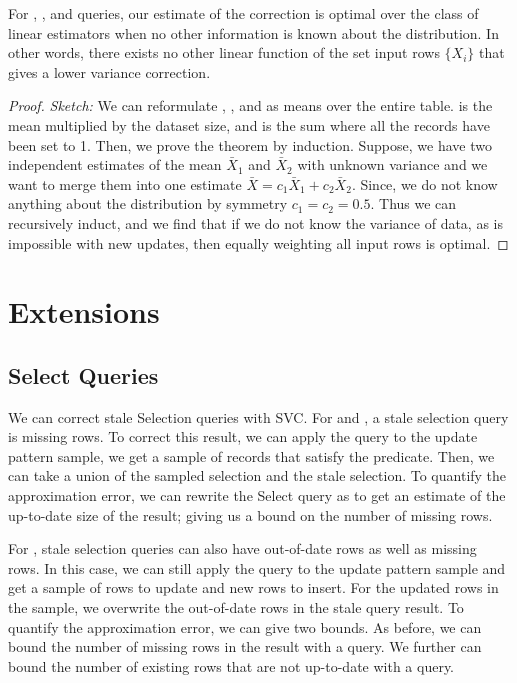 \begin{theorem}
For \sumfunc, \countfunc, and \avgfunc queries, our estimate of the correction is optimal over the class of linear estimators when no other information is known about the distribution. 
In other words, there exists no other linear function of the set input rows $\{ X_i \}$ that gives a lower variance correction.
\end{theorem}
\begin{proof}
\emph{Sketch: } We can reformulate \sumfunc, \countfunc, and \avgfunc as means over the entire table. \sumfunc is the mean multiplied by the dataset size, and \countfunc
is the sum where all the records have been set to 1. Then, we prove the theorem by induction. 
Suppose, we have two independent estimates of the mean $\bar{X}_1$ and $\bar{X}_2$ with unknown variance and we want to merge them into one estimate $\bar{X} = c_1\bar{X}_1+c_2\bar{X}_2$.
Since, we do not know anything about the distribution by symmetry $c_1 = c_2 = 0.5$. 
Thus we can recursively induct, and we find that if we do not know the variance of data, as is impossible with new updates, then equally weighting all input rows is optimal. 
\end{proof}

\section{Extensions}
\subsection{Select Queries}\label{sec:sel}
We can correct stale Selection queries with SVC.
For \fjview and \spview, a stale selection query is missing rows.
To correct this result, we can apply the query to the update pattern sample, we get a sample of records that satisfy the predicate.
Then, we can take a union of the sampled selection and the stale selection.
To quantify the approximation error, we can rewrite the Select query as \countfunc to get an estimate of the up-to-date size of the result; giving us a bound on the number of missing rows.

For \aggview, stale selection queries can also have out-of-date rows as well as missing rows.
In this case, we can still apply the query to the update pattern sample and get a sample of rows to update and new rows to insert.
For the updated rows in the sample, we overwrite the out-of-date rows in the stale query result.
To quantify the approximation error, we can give two bounds.
As before, we can bound the number of missing rows in the result with a \countfunc query.
We further can bound the number of existing rows that are not up-to-date with a \countfunc query.

